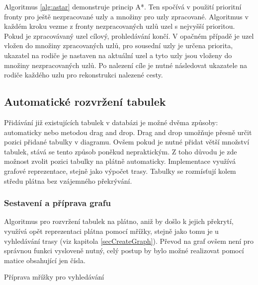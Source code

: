 \documentclass[czech,bachelor,public,dept460,male,oneside]{diploma}
\begin{document}
	Algoritmus \ref{alg:astar} demonstruje princip A*. Ten spočívá v použití prioritní fronty pro ještě nezpracované uzly a množiny pro uzly zpracované. Algoritmus v každém kroku vezme z fronty nezpracovaných uzlů uzel s nejvyšší prioritou. Pokud je zpracovávaný uzel cílový, prohledávání končí. V opačném případě je uzel vložen do množiny zpracovaných uzlů, pro sousední uzly je určena priorita, ukazatel na rodiče je nastaven na aktuální uzel a tyto uzly jsou vloženy do množiny nezpracovaných uzlů. Po nalezení cíle je nutné následovat ukazatele na rodiče každého uzlu pro rekonstrukci nalezené cesty. 
	
	\subsection{Automatické rozvržení tabulek} \label{secTablePos}
	Přidávání již existujících tabulek v databázi je možné dvěma způsoby: automaticky nebo metodou drag and drop. Drag and drop umožňuje přesně určit pozici přidané tabulky v diagramu. Ovšem pokud je nutné přidat větší množství tabulek, stává se tento způsob poněkud nepraktickým. Z toho důvodu je zde možnost zvolit pozici tabulky na plátně automaticky. Implementace využívá grafové reprezentace, stejně jako výpočet trasy. Tabulky se rozmísťují kolem středu plátna bez vzájemného překrývání. 
		
	\subsubsection{Sestavení a příprava grafu}
	Algoritmus pro rozvržení tabulek na plátno, aniž by došlo k jejich překrytí, využívá opět reprezentaci plátna pomocí mřížky, stejně jako tomu je u vyhledávání trasy (viz kapitola \ref{secCreateGraph}). Převod na graf ovšem není pro správnou funkci vysloveně nutný, celý postup by bylo možné realizovat pomocí matice obsahující jen čísla.
	
	\begin{algorithm}[!h]
		
				
		\BlankLine
		
		
		\caption{Příprava mřížky pro vyhledávání}
		\label{alg:preprocessGrid}
	\end{algorithm}
\end{document}
